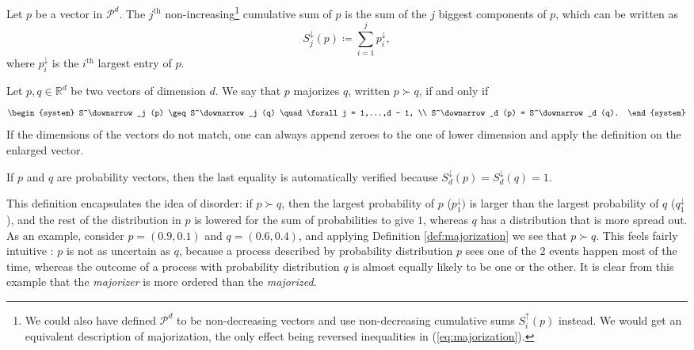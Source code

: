 \begin{definition}[Cumulative sum] %
    Let $p$ be a vector in $\mathcal{P}^d$. The $j^{\text{th}}$ non-increasing\footnote{We could also have defined $\mathcal{P}^d$ to be non-decreasing vectors and use non-decreasing cumulative sums $S^\uparrow_i (p)$ instead. We would get an equivalent description of majorization, the only effect being reversed inequalities in (\ref{eq:majorization}).} cumulative sum of $p$ is the sum of the $j$ biggest components of $p$, which can be written as
    \begin{equation}
        S^\downarrow_j (p) \coloneqq \sum_{i = 1}^{j} p^\downarrow_i,
    \end{equation}
    where $p^\downarrow_i$ is the $i^{\text{th}}$ largest entry of $p$. 

\end{definition}
\begin{definition} \label{def:majorization}
    Let $p, q \in \mathbb{R}^d$ be two vectors of dimension $d$. We say that $p$ majorizes $q$, written $p \succ q$, if and only if
    \begin{equation} \label{eq:majorization}
        \begin{system}
            S^\downarrow_j (p) \geq S^\downarrow_j (q) \quad \forall j = 1,...,d - 1, \\
            S^\downarrow_d (p) = S^\downarrow_d (q).
        \end{system}
    \end{equation}
If the dimensions of the vectors do not match, one can always append zeroes to the one of lower dimension and apply the definition on the enlarged vector.
\end{definition}

\begin{remark}
    If $p$ and $q$ are probability vectors, then the last equality is automatically verified because $S^\downarrow_d (p) = S^\downarrow_d (q) = 1$.
\end{remark}

This definition encapsulates the idea of disorder: if $p \succ q$, then the largest probability of $p$ ($p_1^\downarrow)$ is larger than the largest probability of $q$ ($q_1^\downarrow$), and the rest of the distribution in $p$ is lowered for the sum of probabilities to give $1$, whereas $q$ has a distribution that is more spread out. As an example, consider $p = (0.9, 0.1)$ and $q = (0.6, 0.4)$, and applying Definition \ref{def:majorization} we see that $p \succ q$. This feels fairly intuitive : $p$ is not as uncertain as $q$, because a process described by probability distribution $p$ sees one of the 2 events happen most of the time, whereas the outcome of a process with probability distribution $q$ is almost equally likely to be one or the other. It is clear from this example that the \textit{majorizer} is more ordered than the \textit{majorized}.

